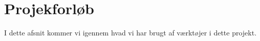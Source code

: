 \section{Projekforløb}
I dette afsnit kommer vi igennem hvad vi har brugt af værktøjer i dette projekt.


